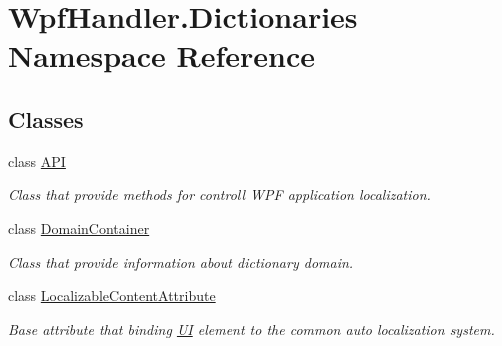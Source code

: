 \hypertarget{namespace_wpf_handler_1_1_dictionaries}{}\section{Wpf\+Handler.\+Dictionaries Namespace Reference}
\label{namespace_wpf_handler_1_1_dictionaries}
\subsection*{Classes}
\begin{DoxyCompactItemize}
\item 
class \mbox{\hyperlink{class_wpf_handler_1_1_dictionaries_1_1_a_p_i}{A\+PI}}
\begin{DoxyCompactList}\small\item\em Class that provide methods for controll W\+PF application localization. \end{DoxyCompactList}\item 
class \mbox{\hyperlink{class_wpf_handler_1_1_dictionaries_1_1_domain_container}{Domain\+Container}}
\begin{DoxyCompactList}\small\item\em Class that provide information about dictionary domain. \end{DoxyCompactList}\item 
class \mbox{\hyperlink{class_wpf_handler_1_1_dictionaries_1_1_localizable_content_attribute}{Localizable\+Content\+Attribute}}
\begin{DoxyCompactList}\small\item\em Base attribute that binding \mbox{\hyperlink{namespace_wpf_handler_1_1_u_i}{UI}} element to the common auto localization system. \end{DoxyCompactList}\end{DoxyCompactItemize}
